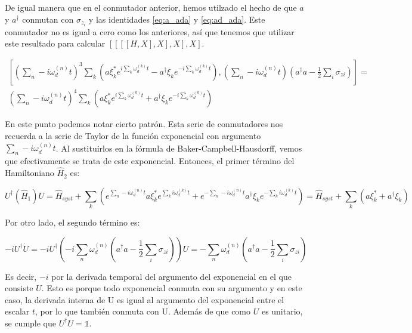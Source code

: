 De igual manera que en el conmutador anterior, hemos utilzado el hecho de que $a$ y $a^\dagger$ conmutan con $\sigma_{z_i}$ y las identidades \ref{eq:a_ada} y \ref{eq:ad_ada}. Este conmutador no es igual a cero como los anteriores, así que tenemos que utilizar este resultado para calcular $[[[[H,X],X],X],X]$.

\begin{multline}
    \left[\left(\sum\limits_n-i \omega_d^{(n)} t\right)^3 \sum\limits_k \left(a\xi_k^*e^{i\sum\limits_k \omega_d^{(k)}t} - a^\dagger\xi_ke^{-i\sum\limits_k \omega_d^{(k)}t}\right), \left(\sum\limits_n-i \omega_d^{(n)} t\right)\left(a^\dagger a - \frac{1}{2} \sum\limits_i \sigma_{z i}\right)\right] = \\
    \left(\sum\limits_n-i \omega_d^{(n)} t\right)^4 \sum\limits_k \left(a\xi_k^*e^{i\sum\limits_k \omega_d^{(k)}t} + a^\dagger\xi_ke^{-i\sum\limits_k \omega_d^{(k)}t}\right)
\end{multline}

En este punto podemos notar cierto patrón. Esta serie de conmutadores nos recuerda a la serie de Taylor de la función exponencial con argumento $\sum\limits_n-i \omega_d^{(n)} t$. Al sustituirlos en la fórmula de Baker-Campbell-Hausdorff, vemos que efectivamente se trata de este exponencial. Entonces, el primer término del Hamiltoniano $\hat{H}_2$ es:

\begin{equation}
    U^\dagger (\hat{H}_1) U = \hat{H}_{syst} + \sum\limits_k (e^{\sum\limits_n-i \omega_d^{(n)} t} a\xi_k^*e^{\sum\limits_k i\omega_d^{(k)}t}+ e^{-\sum\limits_n-i \omega_d^{(n)} t} a^\dagger\xi_ke^{-\sum\limits_k i\omega_d^{(k)}t}) = \hat{H}_{syst} + \sum\limits_k (a\xi_k^* + a^\dagger\xi_k)
\end{equation}

Por otro lado, el segundo término es:

\begin{equation}
    - i U^\dagger \dot{U} = -i U^\dagger (-i \sum\limits_n \omega_d^{(n)} (a^\dagger a - \frac{1}{2} \sum\limits_i \sigma_{z i})) U = - \sum\limits_n \omega_d^{(n)}(a^\dagger a - \frac{1}{2} \sum\limits_i \sigma_{z i})
\end{equation}

Es decir, $-i$ por la derivada temporal del argumento del exponencial en el que consiste $U$. Esto es porque todo exponencial conmuta con su argumento y en este caso, la derivada interna de U es igual al argumento del exponencial entre el escalar $t$, por lo que también conmuta con U. Además de que como $U$ es unitario, se cumple que $U^\dagger U = \mathds{1}$.

